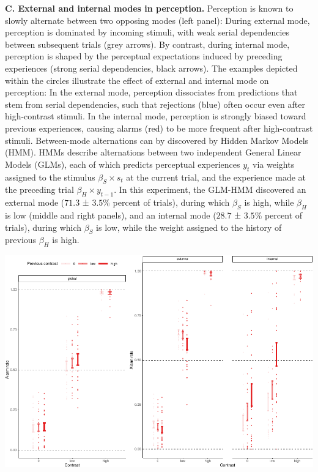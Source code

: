 \documentclass[
]{article}
\begin{document}
\textbf{C. External and internal modes in perception.} Perception is
known to slowly alternate between two opposing modes (left panel):
During external mode, perception is dominated by incoming stimuli, with
weak serial dependencies between subsequent trials (grey arrows). By
contrast, during internal mode, perception is shaped by the perceptual
expectations induced by preceding experiences (strong serial
dependencies, black arrows). The examples depicted within the circles
illustrate the effect of external and internal mode on perception: In
the external mode, perception dissociates from predictions that stem
from serial dependencies, such that rejections (blue) often occur even
after high-contrast stimuli. In the internal mode, perception is
strongly biased toward previous experiences, causing alarms (red) to be
more frequent after high-contrast stimuli. Between-mode alternations can
by discovered by Hidden Markov Models (HMM). HMMs describe alternations
between two independent General Linear Models (GLMs), each of which
predicts perceptual experiences \(y_t\) via weights assigned to the
stimulus \(\beta_S \times s_t\) at the current trial, and the experience
made at the preceding trial \(\beta_H \times y_{t-1}\). In this
experiment, the GLM-HMM discovered an external mode (\(71.3\) ±
\(3.5\)\% percent of trials), during which \(\beta_S\) is high, while
\(\beta_H\) is low (middle and right panels), and an internal mode
(\(28.7\) ± \(3.5\)\% percent of trials), during which \(\beta_S\) is
low, while the weight assigned to the history of previous \(\beta_H\) is
high.

\includegraphics{predictive_templates_files/figure-latex/Figure_2-1.pdf}
\end{document}
